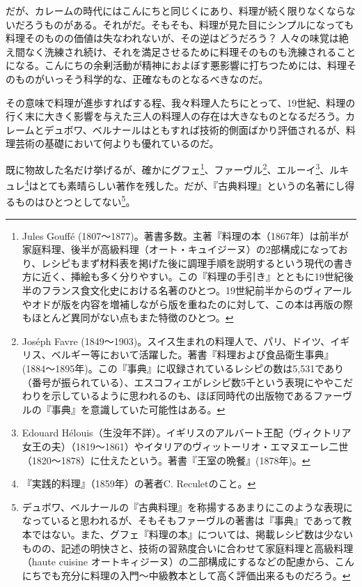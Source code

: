 だが、カレームの時代にはこんにちと同じくにあり、料理が続く限りなくならないだろうものがある。それがだ。そもそも、料理が見た目にシンプルになっても料理そのものの価値は失なわれないが、その逆はどうだろう？
人々の味覚は絶え間なく洗練され続け、それを満足させるために料理そのものも洗練されることになる。こんにちの余剰活動が精神におよぼす悪影響に打ちつためには、料理そのものがいっそう科学的な、正確なものとなるべきなのだ。

その意味で料理が進歩すればする程、我々料理人たちにとって、19世紀、料理の行く末に大きく影響を与えた三人の料理人の存在は大きなものとなるだろう。カレームとデュボワ、ベルナールはともすれば技術的側面ばかり評価されるが、料理芸術の基礎において何よりも優れているのだ。

既に物故した名だけ挙げるが、確かにグフェ\footnote{Jules Gouffé
  (1807〜1877)。著書多数。主著『料理の本（1867年）は前半が家庭料理、後半が高級料理（オート・キュイジーヌ）の2部構成になっており、レシピもまず材料表を掲げた後に調理手順を説明するという現代の書き方に近く、挿絵も多く分りやすい。この『料理の手引き』とともに19世紀後半のフランス食文化史における名著のひとつ。19世紀前半からのヴィアールやオドが版を内容を増補しながら版を重ねたのに対して、この本は再版の際もほとんど異同がない点もまた特徴のひとつ。}、ファーヴル\footnote{Joséph
  Favre
  (1849〜1903)。スイス生まれの料理人で、パリ、ドイツ、イギリス、ベルギー等において活躍した。著書『料理および食品衛生事典』
  (1884〜1895年)。この『事典』に収録されているレシピの数は5,531であり（番号が振られている）、エスコフィエがレシピ数5千という表現にややこだわりを示しているように思われるのも、ほぼ同時代の出版物であるファーヴルの『事典』を意識していた可能性はある。}、エルーイ\footnote{Edouard
  Hélouis（生没年不詳）。イギリスのアルバート王配（ヴィクトリア女王の夫）（1819〜1861）やイタリアのヴィットーリオ・エマヌエーレ二世（1820〜1878）に仕えたという。著書『王室の晩餐』(1878年)。}、ルキュレ\footnote{『実践的料理』（1859年）の著者C.
  Reculetのこと。}はとても素晴らしい著作を残した。だが、『古典料理』というの名著にし得るものはひとつとしてない\footnote{デュボワ、ベルナールの『古典料理』を称揚するあまりにこのような表現になっていると思われるが、そもそもファーヴルの著書は『事典』であって教本ではない。また、グフェ『料理の本』については、掲載レシピ数は少ないものの、記述の明快さと、技術の習熟度合いに合わせて家庭料理と高級料理（haute
  cuisine
  オートキィジーヌ）の二部構成にするなどの配慮から、こんにちでも充分に料理の入門〜中級教本として高く評価出来るものだろう。}。

